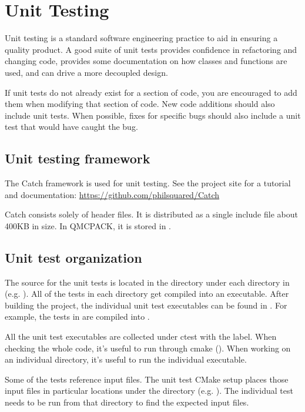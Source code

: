 \chapter{Unit Testing}
\label{chap:unit_testing}

Unit testing is a standard software engineering practice to aid in ensuring a quality product. A good suite of unit tests provides confidence in refactoring and changing code, provides some documentation on how classes and functions are used, and can drive a more decoupled design.

If unit tests do not already exist for a section of code, you are encouraged to add them when modifying that section of code.  New code additions should also include unit tests.
When possible, fixes for specific bugs should also include a unit test that would have caught the bug.

\section {Unit testing framework} The Catch framework is used for unit testing.
See the project site for a tutorial and documentation: \url{https://github.com/philsquared/Catch}

Catch consists solely of header files. It is distributed as a single include file about 400KB in size.  In QMCPACK, it is stored in .

\section{Unit test organization}

The source for the unit tests is located in the  directory under each directory in  (e.g. ).
All of the tests in each  directory get compiled into an executable.
After building the project, the individual unit test executables can be found in .
For example, the tests in  are compiled into .

All the unit test executables are collected under ctest with the  label.
When checking the whole code, it's useful to run through cmake ().
When working on an individual directory, it's useful to run the individual executable.

Some of the tests reference input files. The unit test CMake setup places those input files in particular locations under the  directory (e.g. ).  The individual test needs to be run from that directory to find the expected input files.

